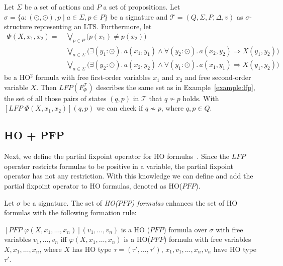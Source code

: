 \begin{example}
    \label{example:ho_lfp} 
    Let $\Sigma$ be a set of actions and $P$ a set of propositions. Let $\sigma = \{a: (\odot, \odot), p \mid a \in \Sigma, p \in P\}$ be a signature and $\mathcal{T} = (Q, \Sigma, P, \Delta, v)$ as $\sigma$-structure representing an LTS. Furthermore, let 
\begin{align*}
\Phi(X, x_1, x_2) =\, &\underset{p\in P}{\bigvee} \big(p(x_1) \neq p(x_2)\big)\\&
 \underset{a\in\Sigma}{\bigvee} \big(\exists (y_1 \colon \odot).\, a(x_1, y_1) \wedge \forall (y_2 
 \colon \odot).\, a(x_2,y_2) \Rightarrow X(y_1, y_2)\big) \\&
\underset{a\in\Sigma}{\bigvee} \big(\exists (y_2 \colon \odot).\, a(x_2, y_2) \wedge \forall (y_1 
\colon \odot).\, a(x_1,y_1) \Rightarrow X(y_1, y_2)\big)
\end{align*}
be a HO$^2$ formula with free first-order variables $x_1$ and $x_2$ and free second-order variable $X$.
Then $LFP(F_\Phi^\mathcal{T})$ describes the same set as in Example~\ref{example:lfp}, the set of all those pairs of states $(q, p)$ in $\mathcal{T}$ that $q\not\sim p$ holds. With $[LFP\; \Phi(X, x_1, x_2)](q, p)$ we can check if $q \not\sim p$, where $q, p \in Q$. 
\end{example}

\subsection{HO + PFP}\label{subsec:ho+Pfp}

Next, we define the partial fixpoint operator for HO formulas~\cite{schewe2006fixpoint}. Since the
$\mathit{LFP}$ operator restricts formulas to be positive in a variable, the partial fixpoint operator has not any
restriction. With this knowledge we can define and
add the partial fixpoint operator to HO formulas, denoted as HO($\mathit{PFP}$).

\begin{definition}
    Let $\sigma$ be a signature. The set of \emph{HO($\mathit{PFP}$) formulas} enhances the set of HO formulas with the
    following formation rule:
    \begin{compactitem}
        \item $[\mathit{PFP}\;\varphi(X, x_1, \dots, x_n)](v_1, \dots, v_n)$ is a HO
        ($\mathit{PFP}$) formula over $\sigma$ with free variables $v_1, \dots, v_n$ iff $\varphi(X, x_1, \dots, x_n)
        $ is a HO($\mathit{PFP}$) formula with free variables $X, x_1, \dots, x_n$, where $X$ has HO type $\tau =
        (\tau', \dots, \tau')$, $x_1, v_1, \dots, x_n, v_n$ have HO type $\tau'$.
    \end{compactitem}
\end{definition}

